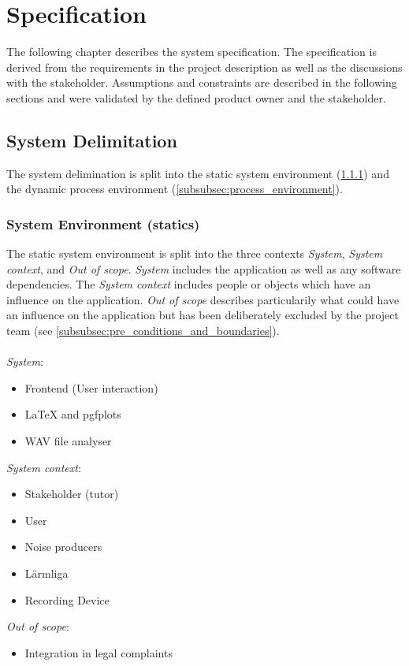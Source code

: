 \section{Specification}
The following chapter describes the system specification. The specification is derived from the requirements in the project description
as well as the discussions with the stakeholder. Assumptions and constraints are described in the following sections and were validated by
the defined product owner and the stakeholder.

\subsection{System Delimitation}
The system delimination is split into the static system environment (\ref{subsubsec:system_environment})
and the dynamic process environment (\ref{subsubsec:process_environment}).

\subsubsection{System Environment (statics)}
\label{subsubsec:system_environment}
The static system environment is split into the three contexts \textit{System}, \textit{System context}, and \textit{Out of scope}. \textit{System} includes the application
as well as any software dependencies. The \textit{System context} includes people or objects which have an influence on the application. \textit{Out of scope} describes particularily
what could have an influence on the application but has been deliberately excluded by the project team (see \ref{subsubsec:pre_conditions_and_boundaries}). \\ \\
\textit{System}:
\begin{itemize}
    \item Frontend (User interaction)
    \item LaTeX and pgfplots
    \item WAV file analyser
\end{itemize}
\textit{System context}:
\begin{itemize}
    \item Stakeholder (tutor)
    \item User
    \item Noise producers
    \item Lärmliga
    \item Recording Device
\end{itemize}
\textit{Out of scope}:
\begin{itemize}
    \item Integration in legal complaints
\end{itemize}


